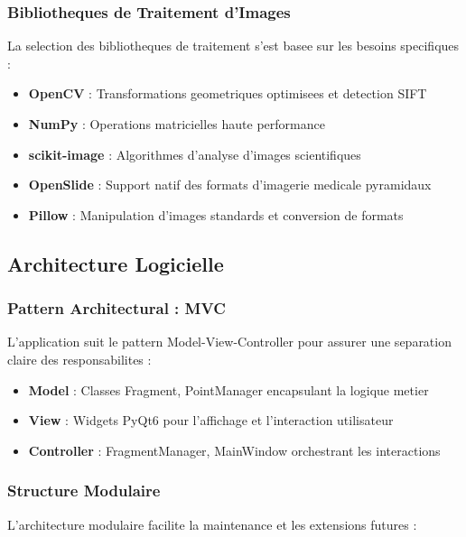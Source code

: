\documentclass[12pt,a4paper]{article}
\begin{document}
\subsubsection{Bibliotheques de Traitement d'Images}

La selection des bibliotheques de traitement s'est basee sur les besoins specifiques :

\begin{itemize}
\item \textbf{OpenCV} : Transformations geometriques optimisees et detection SIFT
\item \textbf{NumPy} : Operations matricielles haute performance
\item \textbf{scikit-image} : Algorithmes d'analyse d'images scientifiques
\item \textbf{OpenSlide} : Support natif des formats d'imagerie medicale pyramidaux
\item \textbf{Pillow} : Manipulation d'images standards et conversion de formats
\end{itemize}

\subsection{Architecture Logicielle}

\subsubsection{Pattern Architectural : MVC}

L'application suit le pattern Model-View-Controller pour assurer une separation claire des responsabilites :

\begin{itemize}
\item \textbf{Model} : Classes Fragment, PointManager encapsulant la logique metier
\item \textbf{View} : Widgets PyQt6 pour l'affichage et l'interaction utilisateur
\item \textbf{Controller} : FragmentManager, MainWindow orchestrant les interactions
\end{itemize}

\subsubsection{Structure Modulaire}

L'architecture modulaire facilite la maintenance et les extensions futures :
\end{document}
